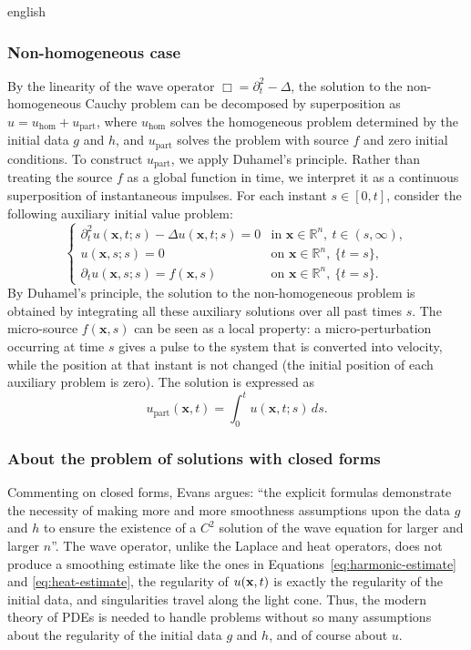 \documentclass[0000.tex]{subfiles}
\begin{document}
\begin{hyphenrules}{english}
\subsubsection{Non-homogeneous case}
By the linearity of the wave operator $\Box=\partial_t^2-\Delta$, the solution to the non-homogeneous
Cauchy problem can be decomposed by superposition as $u=u_{\mathrm{hom}}+u_{\mathrm{part}}$, where
$u_{\mathrm{hom}}$ solves the homogeneous problem determined by the initial data $g$ and $h$, and
$u_{\mathrm{part}}$ solves the problem with source $f$ and zero initial conditions. To construct
$u_{\mathrm{part}}$, we apply Duhamel's principle. Rather than treating the source $f$ as a global
function in time, we interpret it as a continuous superposition of instantaneous impulses. For each
instant $s\in[0,t]$, consider the following auxiliary initial value problem:
\begin{equation}
  \begin{cases}
    \partial_t^2u(\mathbf{x},t;s)-\Delta u(\mathbf{x},t;s)=0 & \text{in } \mathbf{x}\in\mathbb{R}^n,\ t\in(s,\infty),\\
    u(\mathbf{x},s;s)=0 & \text{on } \mathbf{x}\in\mathbb{R}^n,\ \{t=s\},\\
    \partial_t u(\mathbf{x},s;s)=f(\mathbf{x},s) & \text{on } \mathbf{x}\in\mathbb{R}^n,\ \{t=s\}.
  \end{cases}
  \label{eq:wave-duhamel-aux}
\end{equation}
By Duhamel's principle, the solution to the non-homogeneous problem is obtained by integrating all
these auxiliary solutions over all past times $s$. The micro-source $f(\mathbf{x},s)$ can be seen as a local
property: a micro-perturbation occurring at time $s$ gives a pulse to the system that is converted into
velocity, while the position at that instant is not changed (the initial position of each auxiliary
problem is zero). The solution is expressed as
\begin{equation}
  u_{\mathrm{part}}(\mathbf{x},t)=\int_0^t u(\mathbf{x},t;s)\,d s.
  \label{eq:wave-duhamel}
\end{equation}

\subsubsection{About the problem of solutions with closed forms}
Commenting on closed forms, Evans \cite[p.~82]{evans2010} argues: ``the explicit formulas demonstrate the necessity of making more and more smoothness assumptions upon the data $g$ and $h$ to ensure the existence of a $C^2$ solution of the wave equation for larger and larger $n$''. The wave operator, unlike the Laplace
and heat operators, does not produce a smoothing estimate like the ones in
Equations~\eqref{eq:harmonic-estimate} and \eqref{eq:heat-estimate}, the regularity of $u(\mathbf{x},t)$ is exactly the regularity
of the initial data, and singularities travel along the light cone. Thus, the modern theory of PDEs is needed
to handle problems without so many assumptions about the regularity of the initial data $g$ and $h$,
and of course about $u$.


\end{hyphenrules}
\end{document}
